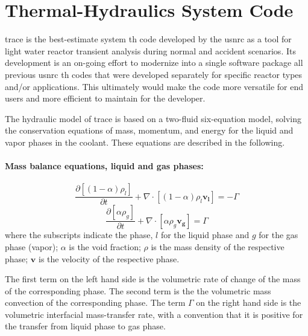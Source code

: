 \section{Thermal-Hydraulics System Code }\label{sec:reflood_trace}

\gls{trace} is the best-estimate system \gls{th} code developed by the \gls{usnrc} 
as a tool for light water reactor transient analysis during normal and accident scenarios.
Its development is an on-going effort 
to modernize into a single software package all previous \gls{usnrc} \gls{th} codes
that were developed separately for specific reactor types and/or applications.
This ultimately would make the code more versatile for end users and more efficient to maintain for the developer.

The hydraulic model of \gls{trace} is based on a two-fluid six-equation model, 
solving the conservation equations of mass, momentum, and energy for the liquid and vapor phases in the coolant.
These equations are described in the following.

\paragraph{Mass balance equations, liquid and gas phases:}
\begin{equation}
	\frac{\partial [(1-\alpha)\rho_l]}{\partial t} + \nabla \cdot [(1-\alpha) \rho_l \mathbf{v_l}] = - \Gamma
\label{eq:mass_balance_liquid}
\end{equation}
\begin{equation}
	\frac{\partial [\alpha \rho_g]}{\partial t} + \nabla \cdot [\alpha \rho_g \mathbf{v_g}] = \Gamma
\label{eq:mass_balance_gas}
\end{equation}
where the subscripts indicate the phase, $l$ for the liquid phase and $g$ for the gas phase (vapor); 
$\alpha$ is the void fraction; 
$\rho$ is the mass density of the respective phase;
$\mathbf{v}$ is the velocity of the respective phase.

The first term on the left hand side is the volumetric rate of change of the mass of the corresponding phase.
The second term is the the volumetric mass convection of the corresponding phase.
The term $\Gamma$ on the right hand side is the volumetric interfacial mass-transfer rate,
with a convention that it is positive for the transfer from liquid phase to gas phase.

